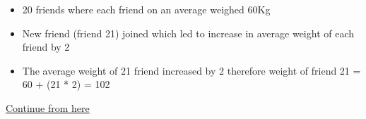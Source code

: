 \begin{itemize}
    \item 20 friends where each friend on an average weighed 60Kg
    \item New friend (friend 21) joined which led to increase in average weight of each friend by 2
    \item The average weight of 21 friend increased by 2 therefore weight of friend 21 = 60 + (21 * 2) = 102
\end{itemize}



\href{https://youtu.be/q-ZUkah-xys?feature=shared&t=1381}{Continue from here}